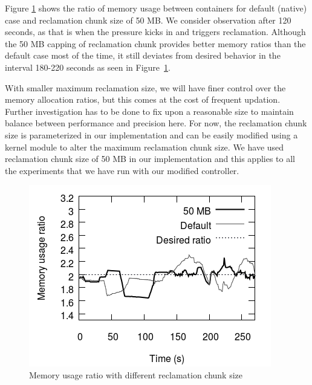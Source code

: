 Figure \ref{mem_ratio} shows the ratio of memory usage between \mongodb{} containers for default (native) case and reclamation
chunk size of 50 MB. We consider observation after 120 seconds, as that is when the pressure kicks in and triggers 
reclamation. Although the 50 MB capping of reclamation chunk provides better memory ratios than the default case most of
the time, it still deviates from desired behavior in the interval 180-220 seconds as seen in Figure~\ref{mem_ratio}. 

With smaller maximum reclamation size, we will have finer control over the memory allocation ratios, but this 
comes at the cost of frequent updation. Further investigation has to be done to fix upon a reasonable size to 
maintain balance between performance and precision here. For now, the reclamation chunk size is parameterized in our implementation and can 
be easily modified using a kernel module to alter the maximum reclamation chunk size. We have used reclamation chunk size of 50 MB in our 
implementation and this applies to all the experiments that we have run with our modified controller.

\begin{figure}
  \centering
  \includegraphics[scale=0.6]{images/mem_sol/memory_ratio.png}
  \caption{Memory usage ratio with different reclamation chunk size}
  \label{mem_ratio}
\end{figure}